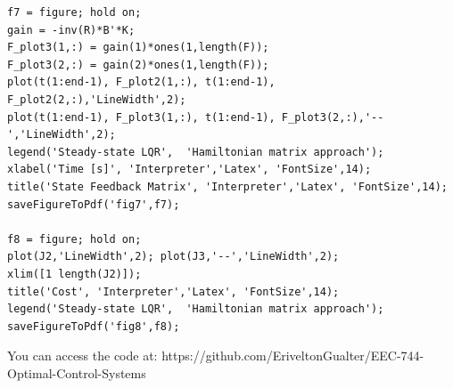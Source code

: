 \documentclass{article}
\begin{document}
\begin{lstlisting}
f7 = figure; hold on;
gain = -inv(R)*B'*K;
F_plot3(1,:) = gain(1)*ones(1,length(F));
F_plot3(2,:) = gain(2)*ones(1,length(F));
plot(t(1:end-1), F_plot2(1,:), t(1:end-1), F_plot2(2,:),'LineWidth',2);
plot(t(1:end-1), F_plot3(1,:), t(1:end-1), F_plot3(2,:),'--','LineWidth',2);
legend('Steady-state LQR',  'Hamiltonian matrix approach');
xlabel('Time [s]', 'Interpreter','Latex', 'FontSize',14);
title('State Feedback Matrix', 'Interpreter','Latex', 'FontSize',14);
saveFigureToPdf('fig7',f7);

f8 = figure; hold on;
plot(J2,'LineWidth',2); plot(J3,'--','LineWidth',2);
xlim([1 length(J2)]);
title('Cost', 'Interpreter','Latex', 'FontSize',14);
legend('Steady-state LQR',  'Hamiltonian matrix approach');
saveFigureToPdf('fig8',f8);
\end{lstlisting}

You can access the code at: https://github.com/EriveltonGualter/EEC-744-Optimal-Control-Systems
\end{document}
